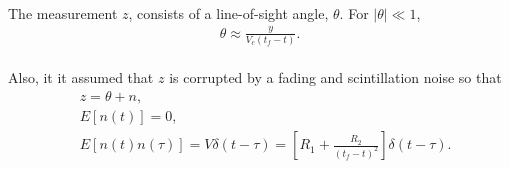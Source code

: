 \paragraph{}
The measurement $z$, consists of a line-of-sight angle, $\theta$. For $|\theta| \ll 1$,
\begin{align*}
\theta \approx \frac{y}{V_c(t_f-t)}.
\end{align*}
\paragraph{}
Also, it it assumed that $z$ is corrupted by a fading and scintillation noise so that
\begin{align*}
&z = \theta + n,\\
&E[n(t)] = 0, \\
&E[n(t)n(\tau)] = V\delta(t-\tau) = [R_1 + \frac{R_2}{(t_f-t)^2}]\delta(t-\tau).
\end{align*}
